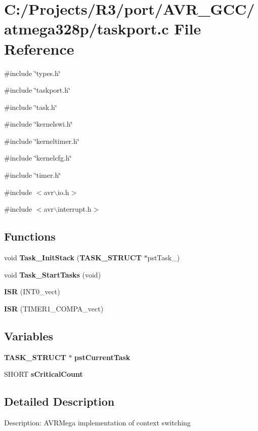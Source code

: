 \section{C:/Projects/R3/port/AVR\_\-GCC/atmega328p/taskport.c File Reference}
\label{taskport_8c}
{\ttfamily \#include \char`\"{}types.h\char`\"{}}\par
{\ttfamily \#include \char`\"{}taskport.h\char`\"{}}\par
{\ttfamily \#include \char`\"{}task.h\char`\"{}}\par
{\ttfamily \#include \char`\"{}kernelswi.h\char`\"{}}\par
{\ttfamily \#include \char`\"{}kerneltimer.h\char`\"{}}\par
{\ttfamily \#include \char`\"{}kernelcfg.h\char`\"{}}\par
{\ttfamily \#include \char`\"{}timer.h\char`\"{}}\par
{\ttfamily \#include $<$avr$\backslash$io.h$>$}\par
{\ttfamily \#include $<$avr$\backslash$interrupt.h$>$}\par
\subsection*{Functions}
\begin{DoxyCompactItemize}
\item 
void {\bf Task\_\-InitStack} ({\bf TASK\_\-STRUCT} $\ast$pstTask\_\-)
\item 
void {\bf Task\_\-StartTasks} (void)
\item 
{\bf ISR} (INT0\_\-vect)
\item 
{\bf ISR} (TIMER1\_\-COMPA\_\-vect)
\end{DoxyCompactItemize}
\subsection*{Variables}
\begin{DoxyCompactItemize}
\item 
{\bf TASK\_\-STRUCT} $\ast$ {\bf pstCurrentTask}
\item 
SHORT {\bf sCriticalCount}
\end{DoxyCompactItemize}


\subsection{Detailed Description}
Description: AVRMega implementation of context switching 

